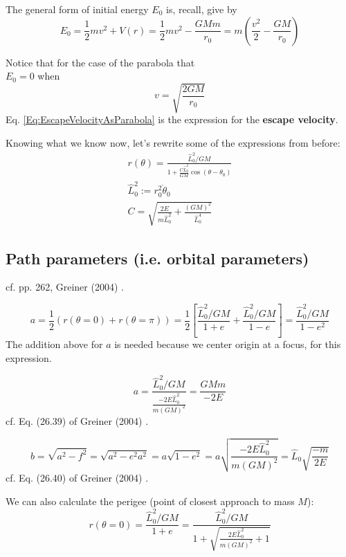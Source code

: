 \documentclass[10pt]{amsart}
\begin{document}
\begin{multicols*}{2}
The general form of initial energy $E_0$ is, recall, give by
\[
E_0 = \frac{1}{2} m v^2 + V(r) = \frac{1}{2} mv^2 - \frac{GMm}{r_0} = m \left( \frac{v^2}{2} - \frac{GM}{r_0} \right) 
\]

Notice that for the case of the parabola that \\
$E_0 =0 $ when 
\begin{equation}\label{Eq:EscapeVelocityAsParabola}
v = \sqrt{ \frac{2GM}{r_0} } 
\end{equation}
Eq. \ref{Eq:EscapeVelocityAsParabola} is the expression for the \textbf{escape velocity}.

Knowing what we know now, let's rewrite some of the expressions from before:
\[
\begin{gathered} 
r(\theta) = \frac{ \widehat{L}_0^2 / GM}{ 1 + \frac{C \widehat{L}_0^2 }{GM} \cos{(\theta - \theta_0)} } \\ 
\widehat{L}_0^2 := r_0^2 \dot{\theta}_0 \\ 
C = \sqrt{\frac{ 2 E}{ m \widehat{L}_0^2 } + \frac{ (GM)^2 }{ \widehat{L}_0^4 } }
\end{gathered} 
\]

\subsection{Path parameters (i.e. orbital parameters)}

cf. pp. 262, Greiner (2004) \cite{Grei2004}.

\[
a = \frac{1}{2} ( r(\theta = 0) + r(\theta = \pi) ) = \frac{1}{2} \left[ \frac{ \widehat{L}_0^2 / GM }{ 1 + e } + \frac{\widehat{L}_0^2 / GM }{ 1- e} \right] = \frac{ \widehat{L}_0^2 / GM}{ 1 - e^2 }
\]
The addition above for $a$ is needed because we center origin at a focus, for this expression. 

\begin{equation}\label{Eq:Semi-MajorAxis}
a = \frac{\widehat{L}_0^2 /GM}{ \frac{ - 2 E \widehat{L}_0^2 }{ m (GM)^2 } } = \frac{ GMm }{ - 2 E} 
\end{equation}
cf. Eq. (26.39) of Greiner (2004) \cite{Grei2004}. 

\begin{equation}
b = \sqrt{ a^2 - f^2 } = \sqrt{a^2 - e^2 a^2 } = a \sqrt{ 1 - e^2 } = a \sqrt{ \frac{ -2 E \widehat{L}_0^2 }{ m (GM)^2 } } = \widehat{L}_0 \sqrt{ \frac{ - m}{ 2E} }
\end{equation}
cf. Eq. (26.40) of Greiner (2004) \cite{Grei2004}. 

We can also calculate the perigee (point of closest approach to mass $M$):
\begin{equation}
r(\theta =0 ) = \frac{ \widehat{L}_0^2 / GM }{ 1 + e } = \frac{ \widehat{L}_0^2 / GM }{ 1 + \sqrt{ \frac{ 2 E \widehat{L}_0^2 }{ m (GM)^2 } + 1 } }
\end{equation}


\end{multicols*}
\end{document}
